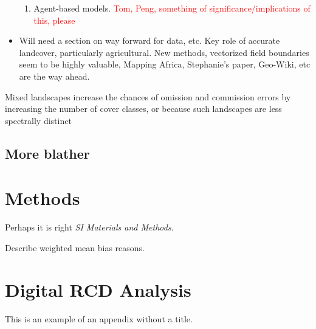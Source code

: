 \documentclass{pnastwo}
\begin{document}
\begin{article}
\begin{itemize}
\begin{enumerate}
      \item Agent-based models. \textcolor{red}{Tom, Peng, something of significance/implications of this, please}
    \end{enumerate}
  \item Will need a section on way forward for data, etc. Key role of accurate landcover, particularly agricultural.  New methods, vectorized field boundaries seem to be highly valuable, Mapping Africa, Stephanie's paper, Geo-Wiki, etc are the way ahead.  
  
    
\end{itemize}




Mixed landscapes increase the chances of omission and commission errors by increasing the number of cover classes, or because such landscapes are less spectrally distinct \cite{estes_diylandcover:_2015}


\subsection{More blather}


\begin{materials}
\section{Methods} 
Perhaps it is right {\it SI Materials and Methods}.

Describe weighted mean bias reasons. 

\section{Digital RCD Analysis} 

\end{materials}

\appendix[App 1]

\appendix
This is an example of an appendix without a title.


\end{article}
\end{document}
